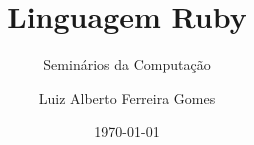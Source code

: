 \author{Luiz Alberto Ferreira Gomes}
\title{Linguagem Ruby}
\subtitle{Seminários da Computação}
\date{\today}
